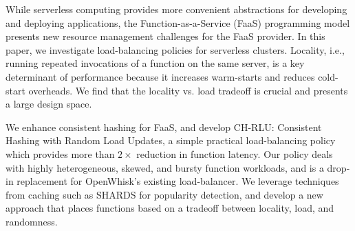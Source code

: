 While serverless computing provides more convenient abstractions for developing and deploying applications, the Function-as-a-Service (FaaS) programming model presents new resource management challenges for the FaaS provider. 
In this paper, we investigate load-balancing policies for serverless clusters.
Locality, i.e., running repeated invocations of a function on the same server, is a key determinant of performance because it increases warm-starts and reduces cold-start overheads. 
We find that the locality vs. load tradeoff is crucial and presents a large design space. 

We enhance consistent hashing for FaaS, and develop CH-RLU: Consistent Hashing with Random Load Updates, a simple practical load-balancing policy which provides more than $2\times$ reduction in function latency. 
Our policy deals with highly heterogeneous, skewed, and bursty function workloads, and is a drop-in replacement for OpenWhisk's existing load-balancer.
We leverage techniques from caching such as SHARDS for popularity detection, and develop a new approach that places functions based on a tradeoff between locality, load, and randomness. 





